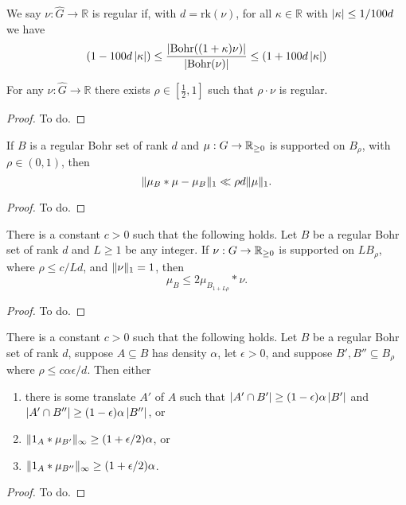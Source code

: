 \begin{definition}[Regularity]
\label{bohr-reg-def}
We say $\nu:\widehat{G}\to \mathbb{R}$ is regular if, with $d=\mathrm{rk}(\nu)$, for all $\kappa\in\mathbb{R}$ with $\left\lvert \kappa\right\rvert\leq 1/100d$ we have
\[(1-100 d\left\lvert \kappa\right\rvert)\leq \frac{\left\lvert \mathrm{Bohr}((1+\kappa)\nu)\right\rvert}{\left\lvert \mathrm{Bohr}(\nu)\right\rvert}\leq(1+ 100 d\left\lvert \kappa\right\rvert)\]
\end{definition}

\begin{lemma}
\label{bohr-regularity}
For any $\nu:\widehat{G}\to \mathbb{R}$ there exists $\rho\in[\frac{1}{2},1]$ such that $\rho\cdot \nu$ is regular.
\end{lemma}
\begin{proof}
To do.
\end{proof}

\begin{lemma}
\label{reg-conv}
If $B$ is a regular Bohr set of rank $d$ and $\mu:G\to\mathbb{R}_{\geq 0}$ is supported on $B_\rho$, with $\rho \in (0,1)$, then
\[ \lVert  \mu_B*\mu - \mu_B \rVert_{1} \ll \rho d\lVert \mu\rVert_1. \]
\end{lemma}
\begin{proof}
To do.
\end{proof}

\begin{lemma}
\label{bohr-majorise}
There is a constant $c>0$ such that the following holds.  Let $B$ be a regular Bohr set of rank $d$ and $L\geq 1$ be any integer. If $\nu:G\to\mathbb{R}_{\geq 0}$ is supported on $L B_\rho$, where $\rho \leq c/Ld$, and $\lVert \nu\rVert_1=1$, then
\[\mu_B \leq 2\mu_{B_{1+L\rho}}\ast \nu.\]
\end{lemma}
\begin{proof}
To do.
\end{proof}

\begin{lemma}
\label{bourgain-trick}
There is a constant $c>0$ such that the following holds. Let $B$ be a regular Bohr set of rank $d$, suppose $A\subseteq B$ has density $\alpha$, let $\epsilon>0$, and suppose $B',B''\subseteq B_\rho$ where $\rho\leq c\alpha\epsilon/d$. Then either
\begin{enumerate}
\item there is some translate $A'$ of $A$ such that $\left\lvert A'\cap B'\right\rvert\geq (1-\epsilon)\alpha\left\lvert B'\right\rvert$ and $\left\lvert A'\cap B''\right\rvert\geq (1-\epsilon)\alpha \left\lvert B''\right\rvert$, or
\item $\lVert 1_{A}\ast \mu_{B'}\rVert_\infty\geq (1+\epsilon/2)\alpha$, or
\item $\lVert 1_{A}\ast \mu_{B''}\rVert_\infty \geq (1+\epsilon/2)\alpha$.
\end{enumerate}
\end{lemma}
\begin{proof}
To do.
\end{proof}
